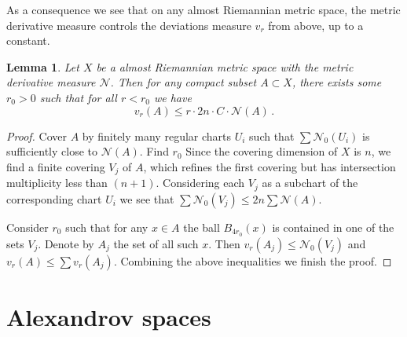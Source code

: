 \documentclass[12pt,leqno,intlimits]{amsart}
\numberwithin{equation}{section}
\newtheorem{lem}[thm]{Lemma}
\theoremstyle{definition}
\theoremstyle{remark}
\begin{document}
As a consequence we see that on any almost Riemannian metric space, the metric derivative measure controls the deviations measure $v_r$ from above, up to a constant.





\begin{lem} \label{cor-mu-dc}
Let $X$ be a almost Riemannian metric space with the metric derivative measure $\mathcal N$.
Then for any compact subset $A\subset X$, there exists some $r_0>0$ such that for all
$r<r_0$ we have $$v_r (A) \leq r\cdot 2n\cdot C\cdot \mathcal N (A)\,. $$
\end{lem}


\begin{proof}
Cover $A$ by finitely many regular charts $U_i$ such that $\sum \mathcal N_0 (U_i)$ is sufficiently close to $\mathcal N (A)$. Find $r_0$
Since the covering dimension of $X$ is $n$, we find   a finite covering $V_j$ of $A$, which refines  the first covering but has intersection multiplicity less than $(n+1)$.  Considering each $V_j$ as a subchart of the corresponding chart $U_i$ we see that $\sum \mathcal N_0 (V_j) \leq 2n \sum \mathcal N(A)$.

Consider $r_0$ such that for any $x\in A$ the ball $B_{4r_0} (x)$ is contained in one of the sets $V_j$.   Denote by $A_j$ the set of all such $x$.
Then $v_r (A_j) \leq  \mathcal N_0 (V_j)$ and $v_r (A) \leq \sum v_r (A_j)$.  Combining the above inequalities we finish the proof.
\end{proof}















\section{Alexandrov spaces} \label{sec:Alex}
\end{document}
